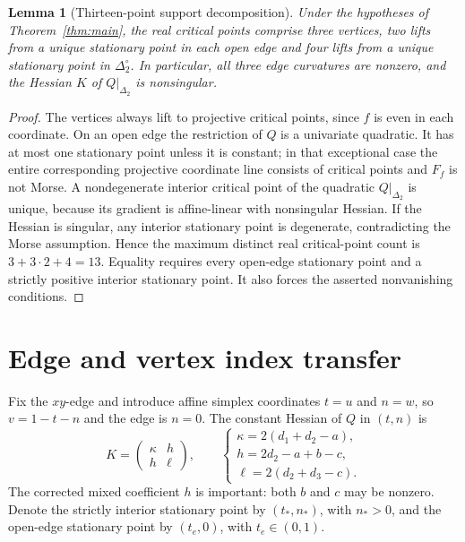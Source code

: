 \documentclass[10pt,a4paper]{article}
\theoremstyle{plain}
\newtheorem{lemma}[theorem]{Lemma}
\theoremstyle{remark}
\begin{document}
\begin{lemma}[Thirteen-point support decomposition]\label{lem:support}
Under the hypotheses of Theorem~\ref{thm:main}, the real critical points comprise three vertices, two lifts from a unique stationary point in each open edge and four lifts from a unique stationary point in $\Delta_2^\circ$. In particular, all three edge curvatures are nonzero, and the Hessian $K$ of $Q|_{\Delta_2}$ is nonsingular.
\end{lemma}
\begin{proof}
The vertices always lift to projective critical points, since $f$ is even in each coordinate. On an open edge the restriction of $Q$ is a univariate quadratic. It has at most one stationary point unless it is constant; in that exceptional case the entire corresponding projective coordinate line consists of critical points and $F_f$ is not Morse. A nondegenerate interior critical point of the quadratic $Q|_{\Delta_2}$ is unique, because its gradient is affine-linear with nonsingular Hessian. If the Hessian is singular, any interior stationary point is degenerate, contradicting the Morse assumption. Hence the maximum distinct real critical-point count is $3+3\cdot2+4=13$. Equality requires every open-edge stationary point and a strictly positive interior stationary point. It also forces the asserted nonvanishing conditions.
\end{proof}

\section{Edge and vertex index transfer}
Fix the $xy$-edge and introduce affine simplex coordinates $t=u$ and $n=w$, so $v=1-t-n$ and the edge is $n=0$. The constant Hessian of $Q$ in $(t,n)$ is
\begin{equation}\label{eq:K}
 K=\begin{pmatrix}\kappa&h\\h&\ell\end{pmatrix},\qquad
 \begin{cases}
 \kappa=2(d_1+d_2-a),\\
 h=2d_2-a+b-c,\\
 \ell=2(d_2+d_3-c).
 \end{cases}
\end{equation}
The corrected mixed coefficient $h$ is important: both $b$ and $c$ may be nonzero. Denote the strictly interior stationary point by $(t_*,n_*)$, with $n_*>0$, and the open-edge stationary point by $(t_e,0)$, with $t_e\in(0,1)$.
\end{document}
